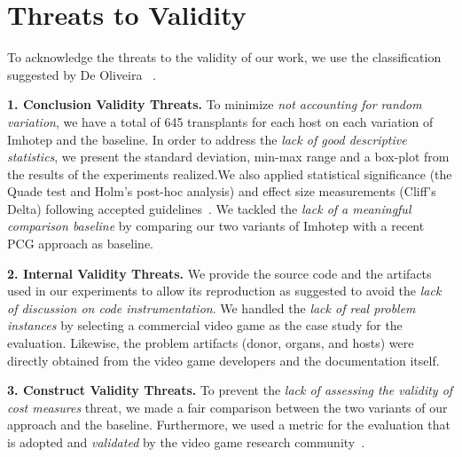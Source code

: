 \section{Threats to Validity}
\label{sec:Threats}

To acknowledge the threats to the validity of our work, we use the classification suggested by De Oliveira \etal~\cite{oliveira2011threats}.

\textbf{1. Conclusion Validity Threats.}
To minimize \textit{not accounting for random variation}, we have a total of 645 transplants for each host on each variation of Imhotep and the baseline.
In order to address the \textit{lack of good descriptive statistics}, we present the standard deviation, min-max range and a box-plot from the results of the experiments realized.We also applied statistical significance (the Quade test and Holm’s post-hoc analysis) and effect size measurements (Cliff’s Delta) following accepted guidelines~\cite{arcuri2013parameter}.
We tackled the \textit{lack of a meaningful comparison baseline} by comparing our two variants of Imhotep with a recent PCG approach as baseline. 


\textbf{2. Internal Validity Threats.}
We provide the source code and the artifacts used in our experiments to allow its reproduction as suggested to avoid the \textit{lack of discussion on code instrumentation}.
We handled the \textit{lack of real problem instances} by selecting a commercial video game as the case study for the evaluation. Likewise, the problem artifacts (donor, organs, and hosts) were directly obtained from the video game developers and the documentation itself. 

\textbf{3. Construct Validity Threats.}
To prevent the \textit{lack of assessing the validity of cost measures} threat, we made a fair comparison between the two variants of our approach and the baseline. Furthermore, we used a metric for the evaluation that is adopted and \textit{validated} by the video game research community~\cite{browne2010evolutionary}.

